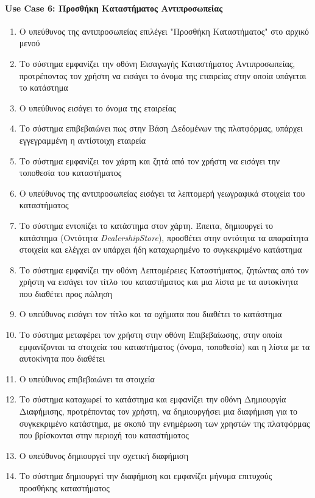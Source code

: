 \documentclass{../ol-softwaremanual}
\begin{document}
	\newpage
	\centering
	
	\paragraph{\en Use Case 6: \gr Προσθήκη Καταστήματος Αντιπροσωπείας}
	
		\begin{enumerate}
		\item Ο υπεύθυνος της αντιπροσωπείας επιλέγει \en"\gr Προσθήκη Καταστήματος\en" \gr στο αρχικό μενού
		\item Το σύστημα εμφανίζει την οθόνη Εισαγωγής Καταστήματος Αντιπροσωπείας, προτρέποντας τον χρήστη να εισάγει το όνομα της εταιρείας στην οποία υπάγεται το κατάστημα
		\item Ο υπεύθυνος εισάγει το όνομα της εταιρείας
		\item Το σύστημα επιβεβαιώνει πως στην Βάση Δεδομένων της πλατφόρμας, υπάρχει εγγεγραμμένη η αντίστοιχη εταιρεία
		\item Το σύστημα εμφανίζει τον χάρτη και ζητά από τον χρήστη να εισάγει την τοποθεσία του καταστήματος
		\item Ο υπεύθυνος της αντιπροσωπείας εισάγει τα λεπτομερή γεωγραφικά στοιχεία του καταστήματος
		\item Το σύστημα εντοπίζει το κατάστημα στον χάρτη. Έπειτα, δημιουργεί το κατάστημα (Οντότητα \en \textit{DealershipStore}\gr), προσθέτει στην οντότητα τα απαραίτητα στοιχεία και ελέγχει αν υπάρχει ήδη καταχωρημένο το συγκεκριμένο κατάστημα
		\item Το σύστημα εμφανίζει την οθόνη Λεπτομέρειες Καταστήματος, ζητώντας από τον χρήστη να εισάγει τον τίτλο του καταστήματος και μια λίστα με τα αυτοκίνητα που διαθέτει προς πώληση
		\item Ο υπεύθυνος εισάγει τον τίτλο και τα οχήματα που διαθέτει το κατάστημα
		\item Το σύστημα μεταφέρει τον χρήστη στην οθόνη Επιβεβαίωσης, στην οποία εμφανίζονται τα στοιχεία του καταστήματος (όνομα, τοποθεσία) και η λίστα με τα αυτοκίνητα που διαθέτει
		\item Ο υπεύθυνος επιβεβαιώνει τα στοιχεία
		\item Το σύστημα καταχωρεί το κατάστημα και εμφανίζει την οθόνη Δημιουργία Διαφήμισης, προτρέποντας τον χρήστη, να δημιουργήσει μια διαφήμιση για το συγκεκριμένο κατάστημα, με σκοπό την ενημέρωση των χρηστών της πλατφόρμας που βρίσκονται στην περιοχή του καταστήματος
		\item Ο υπεύθυνος δημιουργεί την σχετική διαφήμιση
		\item Το σύστημα δημιουργεί την διαφήμιση και εμφανίζει μήνυμα επιτυχούς προσθήκης καταστήματος
	\end{enumerate}
	
\end{document}
